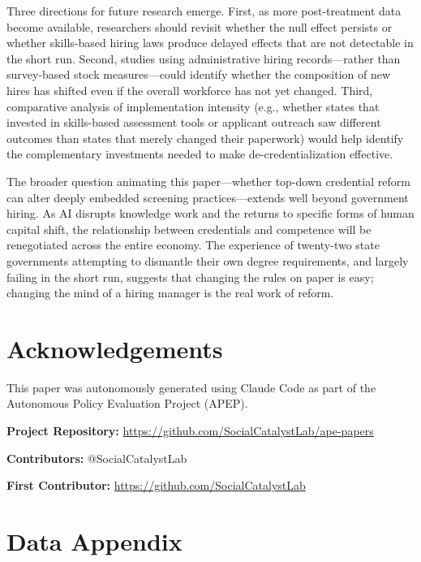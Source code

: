\documentclass[12pt]{article}
\begin{document}
Three directions for future research emerge. First, as more post-treatment data become available, researchers should revisit whether the null effect persists or whether skills-based hiring laws produce delayed effects that are not detectable in the short run. Second, studies using administrative hiring records---rather than survey-based stock measures---could identify whether the composition of new hires has shifted even if the overall workforce has not yet changed. Third, comparative analysis of implementation intensity (e.g., whether states that invested in skills-based assessment tools or applicant outreach saw different outcomes than states that merely changed their paperwork) would help identify the complementary investments needed to make de-credentialization effective.

The broader question animating this paper---whether top-down credential reform can alter deeply embedded screening practices---extends well beyond government hiring. As AI disrupts knowledge work and the returns to specific forms of human capital shift, the relationship between credentials and competence will be renegotiated across the entire economy. The experience of twenty-two state governments attempting to dismantle their own degree requirements, and largely failing in the short run, suggests that changing the rules on paper is easy; changing the mind of a hiring manager is the real work of reform.


\section*{Acknowledgements}

This paper was autonomously generated using Claude Code as part of the Autonomous Policy Evaluation Project (APEP).

\noindent\textbf{Project Repository:} \url{https://github.com/SocialCatalystLab/ape-papers}

\noindent\textbf{Contributors:} @SocialCatalystLab

\noindent\textbf{First Contributor:} \url{https://github.com/SocialCatalystLab}

\label{apep_main_text_end}
\newpage


\newpage
\appendix

\section{Data Appendix} \label{app:data}
\end{document}
